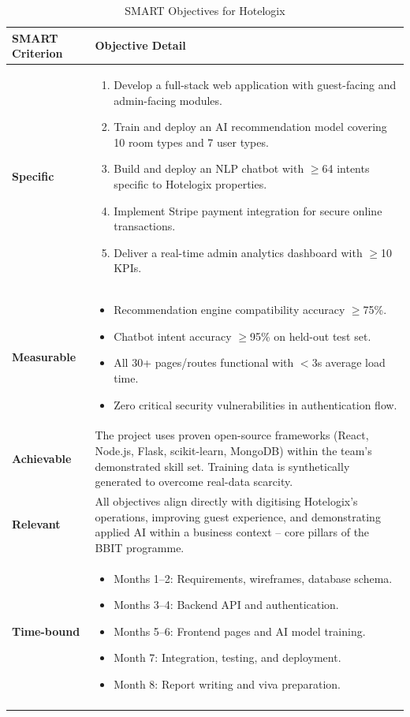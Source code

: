 \documentclass[12pt,a4paper]{report}
\begin{document}
\begin{longtable}{>{\bfseries}p{3.2cm} p{10.5cm}}
\toprule
\textbf{SMART Criterion} & \textbf{Objective Detail} \\
\midrule
\endhead

Specific &
\begin{enumerate}[leftmargin=*, label=O\arabic*., nosep]
  \item Develop a full-stack web application with guest-facing and admin-facing modules.
  \item Train and deploy an AI recommendation model covering 10 room types and 7 user types.
  \item Build and deploy an NLP chatbot with $\geq$64 intents specific to Hotelogix properties.
  \item Implement Stripe payment integration for secure online transactions.
  \item Deliver a real-time admin analytics dashboard with $\geq$10 KPIs.
\end{enumerate} \\[6pt]

Measurable &
\begin{itemize}[leftmargin=*, nosep]
  \item Recommendation engine compatibility accuracy $\geq$75\%.
  \item Chatbot intent accuracy $\geq$95\% on held-out test set.
  \item All 30+ pages/routes functional with $<$3s average load time.
  \item Zero critical security vulnerabilities in authentication flow.
\end{itemize} \\[6pt]

Achievable &
The project uses proven open-source frameworks (React, Node.js, Flask, scikit-learn, MongoDB) within the team's demonstrated skill set. Training data is synthetically generated to overcome real-data scarcity. \\[6pt]

Relevant &
All objectives align directly with digitising Hotelogix's operations, improving guest experience, and demonstrating applied AI within a business context -- core pillars of the BBIT programme. \\[6pt]

Time-bound &
\begin{itemize}[leftmargin=*, nosep]
  \item Months 1--2: Requirements, wireframes, database schema.
  \item Months 3--4: Backend API and authentication.
  \item Months 5--6: Frontend pages and AI model training.
  \item Month 7: Integration, testing, and deployment.
  \item Month 8: Report writing and viva preparation.
\end{itemize} \\

\bottomrule
\caption{SMART Objectives for Hotelogix}
\end{longtable}
\end{document}
